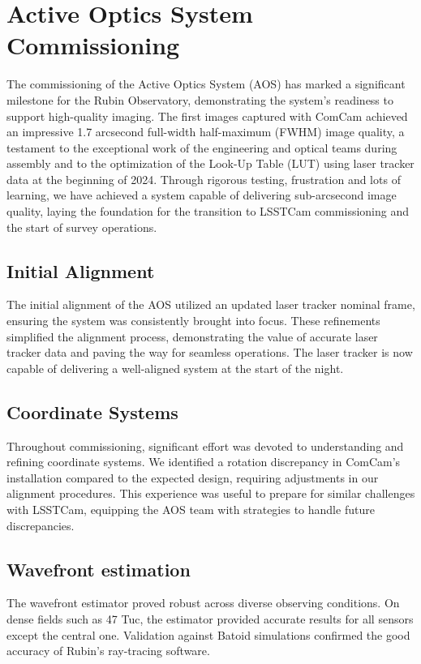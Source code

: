 \section{Active Optics System Commissioning}
\label{sec:aos_commissioning}

The commissioning of the Active Optics System (AOS) has marked a significant milestone for the Rubin Observatory, 
demonstrating the system's readiness to support high-quality imaging. The first images captured with ComCam 
achieved an impressive 1.7 arcsecond full-width half-maximum (FWHM) image quality, a testament to the exceptional
work of the engineering and optical teams during assembly and to the optimization of the Look-Up Table (LUT) using 
laser tracker data at the beginning of 2024. Through rigorous testing, frustration and lots of learning, 
we have achieved a system capable of delivering sub-arcsecond image quality, 
laying the foundation for the transition to LSSTCam commissioning and the start of survey operations.

\subsection{Initial Alignment}
The initial alignment of the AOS utilized an updated laser tracker nominal frame, ensuring the system was 
consistently brought into focus. These refinements simplified the alignment process, demonstrating the 
value of accurate laser tracker data and paving the way for seamless operations. The laser tracker is now
capable of delivering a well-aligned system at the start of the night.

\subsection{Coordinate Systems}
Throughout commissioning, significant effort was devoted to understanding and refining coordinate systems. 
We identified a rotation discrepancy in ComCam's installation compared to the expected design, requiring 
adjustments in our alignment procedures. This experience was useful to prepare for similar challenges 
with LSSTCam, equipping the AOS team with strategies to handle future discrepancies.

\subsection{Wavefront estimation}
The wavefront estimator proved robust across diverse observing conditions. 
On dense fields such as 47 Tuc, the estimator provided accurate results for 
all sensors except the central one. Validation against Batoid simulations confirmed 
the good accuracy of Rubin's ray-tracing software.

